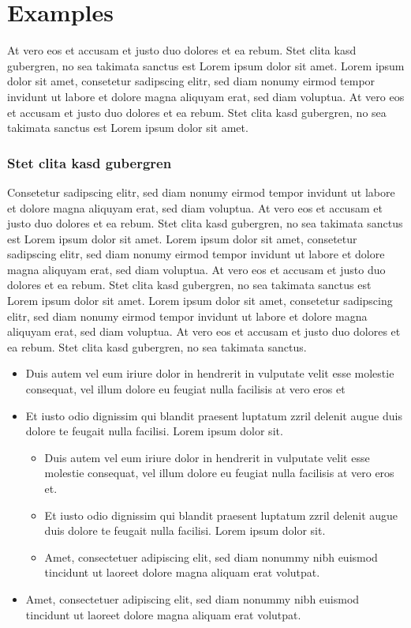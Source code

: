
\chapter{Examples}

At vero eos et accusam et justo duo dolores et ea rebum. Stet clita kasd gubergren, no sea takimata sanctus est Lorem ipsum dolor sit amet. Lorem ipsum dolor sit amet, consetetur sadipscing elitr, sed diam nonumy eirmod tempor invidunt ut labore et \citep{Aubert.Kornprobst-2006} dolore magna aliquyam erat, sed diam voluptua. At vero eos et accusam et justo duo dolores et ea rebum. Stet clita kasd gubergren, no sea takimata sanctus est Lorem ipsum dolor sit amet.


\subsection{Stet clita kasd gubergren}
Consetetur \citep{Goshtasby.Satter-2008} sadipscing elitr, sed diam nonumy eirmod tempor invidunt ut labore et dolore magna aliquyam erat, sed diam voluptua. At vero eos et accusam et justo duo dolores et ea rebum. Stet clita kasd gubergren, no sea takimata sanctus est Lorem ipsum dolor sit amet. Lorem ipsum dolor sit amet, consetetur sadipscing elitr, sed diam nonumy eirmod tempor invidunt ut labore et dolore magna aliquyam erat, sed diam voluptua. At vero eos et accusam et justo duo dolores et ea rebum. Stet clita kasd gubergren, no sea takimata sanctus est Lorem ipsum dolor sit amet. Lorem ipsum dolor sit amet, consetetur sadipscing elitr, sed diam nonumy eirmod tempor invidunt ut labore et dolore magna aliquyam erat, sed diam voluptua. At vero eos et accusam et justo duo dolores et ea rebum. Stet clita kasd gubergren, no sea takimata sanctus.
\begin{itemize}
\item Duis autem vel eum iriure dolor in hendrerit in vulputate velit esse molestie consequat, vel illum dolore eu feugiat nulla facilisis at vero eros et
\item Et iusto odio dignissim qui blandit praesent luptatum zzril delenit augue duis dolore te feugait nulla facilisi. Lorem ipsum dolor sit.
\begin{itemize}
\item Duis autem vel eum iriure dolor in hendrerit in vulputate velit esse molestie consequat, vel illum dolore eu feugiat nulla facilisis at vero eros et.
\item Et iusto odio dignissim qui blandit praesent luptatum zzril delenit augue duis dolore te feugait nulla facilisi. Lorem ipsum dolor sit.
\item Amet, consectetuer adipiscing elit, sed diam nonummy nibh euismod tincidunt ut laoreet dolore magna aliquam erat volutpat.
\end{itemize}
\item Amet, consectetuer adipiscing elit, sed diam nonummy nibh euismod tincidunt ut laoreet dolore magna aliquam erat volutpat.
\end{itemize}
